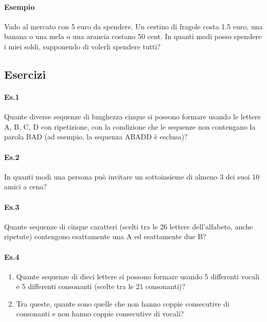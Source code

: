 \paragraph{Esempio} %
Vado al mercato con 5 euro da spendere. Un cestino di fragole costa 1.5 euro,
una banana o una mela o una arancia costano 50 cent. In quanti modi posso
spendere i miei soldi, supponendo di volerli spendere tutti?


\subsection{Esercizi}

\paragraph{Es.1} Quante diverse sequenze di lunghezza cinque si possono formare usando le lettere
A, B, C, D con ripetizione, con la condizione che le sequenze non contengano la parola BAD
(ad esempio, la sequenza ABADD è esclusa)?

\paragraph{Es.2} In quanti modi una persona può invitare un sottoinsieme di almeno 3 dei suoi 10 amici a cena?

\paragraph{Es.3} Quante sequenze di cinque caratteri (scelti tra le 26 lettere dell'alfabeto, anche ripetute)
contengono esattamente una A ed esattamente due B?

\paragraph{Es.4}
\begin{enumerate}
    \item Quante sequenze di dieci lettere si possono formare usando 5 differenti vocali
e 5 differenti consonanti (scelte tra le 21 consonanti)?
\item Tra queste, quante sono quelle che non hanno coppie consecutive di
consonanti e non hanno coppie consecutive di vocali?
\end{enumerate}

